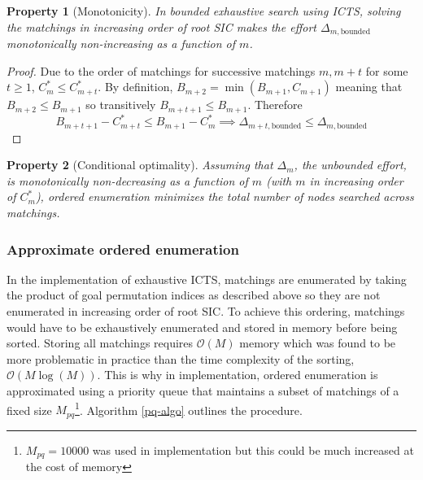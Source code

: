 \documentclass[english]{article}
\newtheorem{property}{Property}
\begin{document}
	\begin{property}[Monotonicity]
		\label{monotonicity}
		In bounded exhaustive search using ICTS, solving the matchings in increasing order of root SIC makes the effort $\Delta_{m,\text{bounded}}$ monotonically non-increasing as a function of $m$.
	\end{property}
	\begin{proof}
		Due to the order of matchings for successive matchings $m,m+t$ for some $t\geq 1$, $C^*_{m} \leq C^*_{m+t}$. By definition, $B_{m+2} = \min(B_{m+1},C_{m+1})$ meaning that $B_{m+2} \leq B_{m + 1}$ so transitively $B_{m+t+1} \leq B_{m+1}$. Therefore
		\[B_{m+t+1} - C^*_{m+t}\leq B_{m+1} - C^*_m\implies \Delta_{m+t,\text{bounded}} \leq \Delta_{m,\text{bounded}}\]
	\end{proof}
	\begin{property}[Conditional optimality]
		\label{cond-monoton-optim}
		Assuming that $\Delta_m$, the unbounded effort, is monotonically non-decreasing as a function of $m$ (with $m$ in increasing order of $C^*_m$), ordered enumeration minimizes the total number of nodes searched across matchings.
	\end{property}
	\subsubsection{Approximate ordered enumeration}
	In the implementation of exhaustive ICTS, matchings are enumerated by taking the product of goal permutation indices as described above so they are not enumerated in increasing order of root SIC. To achieve this ordering, matchings would have to be exhaustively enumerated and stored in memory before being sorted. Storing all matchings requires $\mathcal{O}(M)$ memory which was found to be more problematic in practice than the time complexity of the sorting, $\mathcal{O}(M\log(M))$. This is why in implementation, ordered enumeration is approximated using a priority queue that maintains a subset of matchings of a fixed size $M_{pq}$\footnote{$M_{pq} = 10000$ was used in implementation but this could be much increased at the cost of memory}. Algorithm \ref{pq-algo} outlines the procedure.
	
	
	
\end{document}
